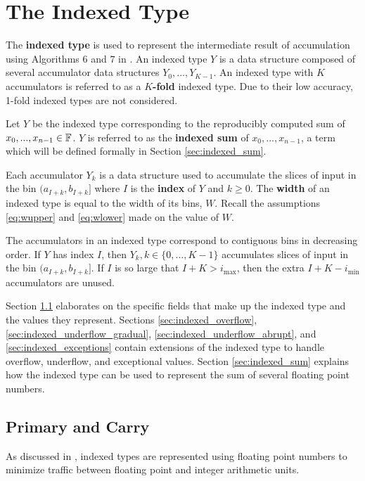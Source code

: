 \section{The Indexed Type}
  \label{sec:indexed}
    The \textbf{indexed type} is used to represent the intermediate result of
    accumulation using Algorithms 6 and $7$ in \cite{repsum}.  An indexed type
    $Y$ is a data structure composed of several accumulator data structures
    $Y_0, ..., Y_{K - 1}$. An indexed type with $K$ accumulators is referred to
    as a \textbf{$K$-fold} indexed type. Due to their low accuracy, 1-fold
    indexed types are not considered.

    Let $Y$ be the indexed type corresponding to the reproducibly computed sum
    of $x_0, ..., x_{n - 1} \in \mathbb{F}$. $Y$ is referred to as the \textbf{indexed
    sum} of $x_0, ..., x_{n - 1}$, a term which will be defined formally in
    Section \ref{sec:indexed_sum}.

    Each accumulator $Y_k$ is a data structure used to accumulate the slices of
    input in the bin $(a_{I + k}, b_{I + k}]$ where $I$ is the \textbf{index}
    of $Y$ and $k \geq 0$. The \textbf{width} of an indexed
    type is equal to the width of its bins, $W$. Recall the assumptions
    \eqref{eq:wupper} and \eqref{eq:wlower} made on the value of $W$.

    The accumulators in an indexed type correspond to contiguous bins in
    decreasing order.     If $Y$ has index $I$, then $Y_k, k \in \{0, ..., K - 1\}$ accumulates slices
    of input in the bin $(a_{I + k}, b_{I + k}]$. If $I$ is so large that
    $I + K > i_{\max}$, then the extra $I + K - i_{\min}$ accumulators are unused.

    Section \ref{sec:indexed_primary_carry} elaborates on the specific fields
    that make up the indexed type and the values they represent. Sections
    \ref{sec:indexed_overflow}, \ref{sec:indexed_underflow_gradual},
    \ref{sec:indexed_underflow_abrupt}, and \ref{sec:indexed_exceptions}
    contain extensions of the indexed type to handle overflow, underflow, and
    exceptional values. Section \ref{sec:indexed_sum} explains how the indexed type can be used to represent the sum of several floating point numbers.

    \subsection{Primary and Carry}
      \label{sec:indexed_primary_carry}
      As discussed in \cite{repsum}, indexed types are represented using
      floating point numbers to minimize traffic between floating point and
      integer arithmetic units.

